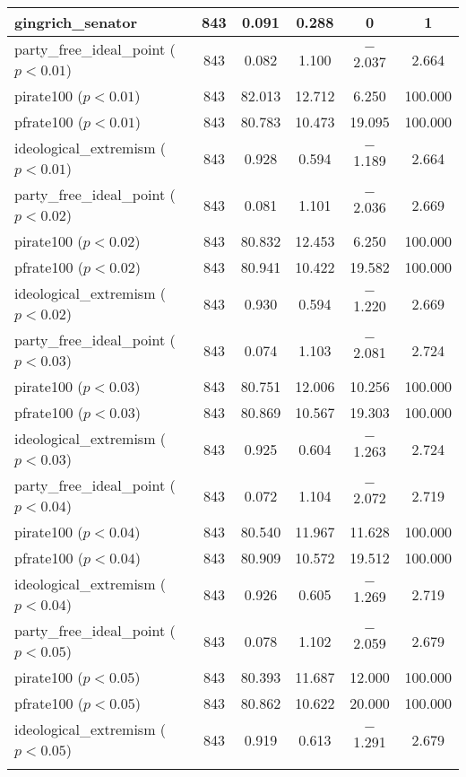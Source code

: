 \documentclass[12pt]{article}
\begin{document}
\begin{table}[ht]
\begin{tabular}{@{\extracolsep{5pt}}lccccc}
		gingrich\_senator & 843 & 0.091 & 0.288 & 0 & 1 \\ 
		\hline
		party\_free\_ideal\_point ($p < 0.01$) & 843 & 0.082 & 1.100 & $-$2.037 & 2.664 \\ 
		pirate100 ($p < 0.01 $) & 843 & 82.013 & 12.712 & 6.250 & 100.000 \\ 
		pfrate100 ($ p < 0.01 $) & 843 & 80.783 & 10.473 & 19.095 & 100.000 \\ 
		ideological\_extremism ($ p < 0.01 $) & 843 & 0.928 & 0.594 & $-$1.189 & 2.664 \\ 
		\hline
		party\_free\_ideal\_point ($ p < 0.02 $) & 843 & 0.081 & 1.101 & $-$2.036 & 2.669 \\ 
		pirate100 ($ p < 0.02 $) & 843 & 80.832 & 12.453 & 6.250 & 100.000 \\ 
		pfrate100 ($ p < 0.02 $) & 843 & 80.941 & 10.422 & 19.582 & 100.000 \\ 
		ideological\_extremism ($ p < 0.02 $) & 843 & 0.930 & 0.594 & $-$1.220 & 2.669 \\ 
		\hline 
		party\_free\_ideal\_point ($ p < 0.03 $) & 843 & 0.074 & 1.103 & $-$2.081 & 2.724 \\ 
		pirate100 ($ p < 0.03 $) & 843 & 80.751 & 12.006 & 10.256 & 100.000 \\ 
		pfrate100 ($ p < 0.03 $) & 843 & 80.869 & 10.567 & 19.303 & 100.000 \\ 
		ideological\_extremism ($ p < 0.03 $) & 843 & 0.925 & 0.604 & $-$1.263 & 2.724 \\ 
		\hline
		party\_free\_ideal\_point ($ p < 0.04 $) & 843 & 0.072 & 1.104 & $-$2.072 & 2.719 \\ 
		pirate100 ($ p < 0.04 $) & 843 & 80.540 & 11.967 & 11.628 & 100.000 \\ 
		pfrate100 ($ p < 0.04 $) & 843 & 80.909 & 10.572 & 19.512 & 100.000 \\ 
		ideological\_extremism ($ p < 0.04 $) & 843 & 0.926 & 0.605 & $-$1.269 & 2.719 \\ 
		\hline
		party\_free\_ideal\_point ($ p < 0.05 $) & 843 & 0.078 & 1.102 & $-$2.059 & 2.679 \\ 
		pirate100 ($ p < 0.05 $) & 843 & 80.393 & 11.687 & 12.000 & 100.000 \\ 
		pfrate100 ($ p < 0.05 $) & 843 & 80.862 & 10.622 & 20.000 & 100.000 \\ 
		ideological\_extremism ($ p < 0.05 $) & 843 & 0.919 & 0.613 & $-$1.291 & 2.679 \\ 
		\hline \\[-1.8ex] 
	\end{tabular} 
\end{table}
\end{document}
